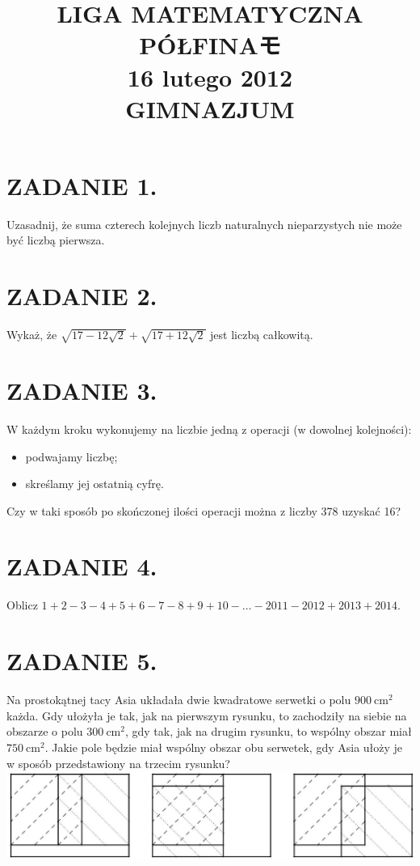 \documentclass[10pt]{article}
\title{LIGA MATEMATYCZNA \\
 PÓŁFINAモ \\
 16 lutego 2012 \\
 GIMNAZJUM }
\author{}
\date{}
\begin{document}
\maketitle
\section*{ZADANIE 1.}
Uzasadnij, że suma czterech kolejnych liczb naturalnych nieparzystych nie może być liczbą pierwsza.

\section*{ZADANIE 2.}
Wykaż, że \(\sqrt{17-12 \sqrt{2}}+\sqrt{17+12 \sqrt{2}}\) jest liczbą całkowitą.

\section*{ZADANIE 3.}
W każdym kroku wykonujemy na liczbie jedną z operacji (w dowolnej kolejności):

\begin{itemize}
  \item podwajamy liczbę;
  \item skreślamy jej ostatnią cyfrę.
\end{itemize}

Czy w taki sposób po skończonej ilości operacji można z liczby 378 uzyskać 16?

\section*{ZADANIE 4.}
Oblicz \(1+2-3-4+5+6-7-8+9+10-\ldots-2011-2012+2013+2014\).

\section*{ZADANIE 5.}
Na prostokątnej tacy Asia układała dwie kwadratowe serwetki o polu \(900 \mathrm{~cm}^{2}\) każda. Gdy ułożyła je tak, jak na pierwszym rysunku, to zachodziły na siebie na obszarze o polu \(300 \mathrm{~cm}^{2}\), gdy tak, jak na drugim rysunku, to wspólny obszar miał \(750 \mathrm{~cm}^{2}\). Jakie pole będzie miał wspólny obszar obu serwetek, gdy Asia ułoży je w sposób przedstawiony na trzecim rysunku?\\
\includegraphics[max width=\textwidth, center]{2024_11_21_4688d04d730bb3126de2g-1}
\end{document}
